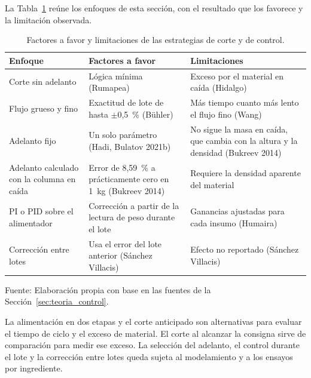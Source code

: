 La Tabla~\ref{tab:control_enfoques} reúne los enfoques de esta sección, con el
resultado que los favorece y la limitación observada.

\begin{table}[H]
    \centering
    \caption{Factores a favor y limitaciones de las estrategias de corte y de control.}
    \label{tab:control_enfoques}
    \footnotesize
    \setlength{\tabcolsep}{3pt}
    \renewcommand{\arraystretch}{1.25}

    \begin{tabularx}{\textwidth}{
        >{\raggedright\arraybackslash}p{}
        >{\raggedright\arraybackslash}X
        >{\raggedright\arraybackslash}X}
        \toprule[1pt]
        \textbf{Enfoque} & \textbf{Factores a favor} & \textbf{Limitaciones} \\
        \midrule[1pt]
        Corte sin adelanto & Lógica mínima (Rumapea) & Exceso por el material
        en caída (Hidalgo) \\
        Flujo grueso y fino & Exactitud de lote de hasta $\pm$0,5~\% (Bühler)
        & Más tiempo cuanto más lento el flujo fino (Wang) \\
        Adelanto fijo & Un solo parámetro (Hadi, Bulatov 2021b) & No sigue la masa
        en caída, que cambia con la altura y la densidad (Bukreev 2014) \\
        Adelanto calculado con la columna en caída & Error de 8,59~\% a
        prácticamente cero en 1~kg (Bukreev 2014) & Requiere la densidad
        aparente del material \\
        PI o PID sobre el alimentador & Corrección a partir de la lectura
        de peso durante el lote & Ganancias ajustadas para cada insumo
        (Humaira) \\
        Corrección entre lotes & Usa el error del lote anterior (Sánchez
        Villacis) & Efecto no reportado (Sánchez Villacis) \\
        \bottomrule[1pt]
    \end{tabularx}

    \vspace{2pt}
    {\footnotesize Fuente: Elaboración propia con base en las fuentes de la
    Sección~\ref{sec:teoria_control}.}
\end{table}

La alimentación en dos etapas y el corte anticipado son alternativas para
evaluar el tiempo de ciclo y el exceso de material. El corte al alcanzar
la consigna sirve de comparación para medir ese exceso. La selección del
adelanto, el control durante el lote y la corrección entre lotes queda
sujeta al modelamiento y a los ensayos por ingrediente.

